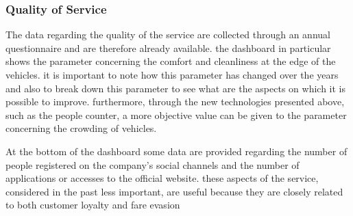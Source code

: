 \newpage
\begin{landscape}
\thispagestyle{empty}

\end{landscape}

\subsubsection{Quality of Service}
The data regarding the quality of the service are collected through an annual questionnaire and are therefore already available. the dashboard in particular shows the parameter concerning the comfort and cleanliness at the edge of the vehicles. it is important to note how this parameter has changed over the years and also to break down this parameter to see what are the aspects on which it is possible to improve. furthermore, through the new technologies presented above, such as the people counter, a more objective value can be given to the parameter concerning the crowding of vehicles.

At the bottom of the dashboard some data are provided regarding the number of people registered on the company's social channels and the number of applications or accesses to the official website. these aspects of the service, considered in the past less important, are useful because they are closely related to both customer loyalty and fare evasion




